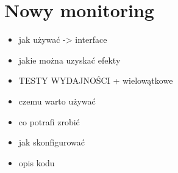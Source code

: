 \section{Nowy monitoring}
\begin{itemize}
\item jak używać -> interface
\item jakie można uzyskać efekty
\item TESTY WYDAJNOŚCI + wielowątkowe
\item czemu warto używać
\item co potrafi zrobić
\item jak skonfigurować
\item opis kodu
\end{itemize}